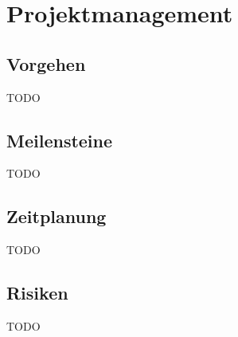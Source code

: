 
\section{Projektmanagement}
\label{sec:Projektmanagement}

\subsection{Vorgehen}
\label{sub:Vorgehen}

TODO

\subsection{Meilensteine}
\label{sub:Meilensteine}

TODO

\subsection{Zeitplanung}
\label{sub:Zeitplanung}

TODO

\subsection{Risiken}
\label{sub:Risiken}

TODO